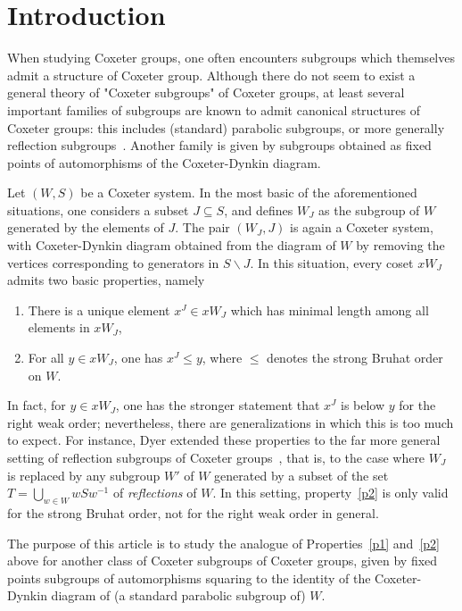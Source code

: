 \section{Introduction}

When studying Coxeter groups, one often encounters subgroups which themselves admit a structure of Coxeter group. Although there do not seem to exist a general theory of "Coxeter subgroups" of Coxeter groups, at least several important families of subgroups are known to admit canonical structures of Coxeter groups: this includes (standard) parabolic subgroups, or more generally reflection subgroups~\cite{Deodhar, Dyer_subgroups}. Another family is given by subgroups obtained as fixed points of automorphisms of the Coxeter-Dynkin diagram. 

Let $(W,S)$ be a Coxeter system. In the most basic of the aforementioned situations, one considers a subset $J\subseteq S$, and defines $W_J$ as the subgroup of $W$ generated by the elements of $J$. The pair $(W_J, J)$ is again a Coxeter system, with Coxeter-Dynkin diagram obtained from the diagram of $W$ by removing the vertices corresponding to generators in $S\backslash J$. In this situation, every coset $x W_J$ admits two basic properties, namely
\begin{enumerate}
\item \label{p1}
There is a unique element $x^J\in x W_J$ which has minimal length among all elements in $x W_J$,
\item \label{p2}
For all $y\in x W_J$, one has $x^J \leq y$, where $\leq$ denotes the strong Bruhat order on $W$.
\end{enumerate}

In fact, for $y\in x W_J$, one has the stronger statement that $x^J$ is below $y$ for the right weak order; nevertheless, there are generalizations in which this is too much to expect. For instance, Dyer extended these properties to the far more general setting of reflection subgroups of Coxeter groups~\cite[Theorem 1.4]{Dyer_Bruhat}, that is, to the case where $W_J$ is replaced by any subgroup $W'$ of $W$ generated by a subset of the set $T=\bigcup_{w\in W} w S w^{-1}$ of \textit{reflections} of $W$. In this setting, property~\ref{p2} is only valid for the strong Bruhat order, not for the right weak order in general.  

The purpose of this article is to study the analogue of Properties~\ref{p1} and~\ref{p2} above for another class of Coxeter subgroups of Coxeter groups, given by fixed points subgroups of automorphisms squaring to the identity of the Coxeter-Dynkin diagram of (a standard parabolic subgroup of) $W$. 


